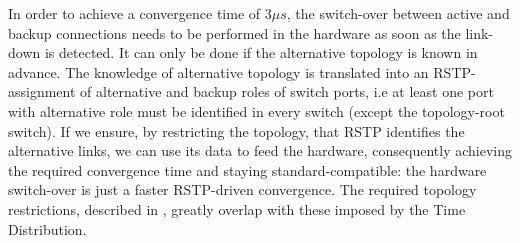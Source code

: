 In order to achieve a convergence time of 3$\mu s$, the switch-over between active 
and backup connections needs to be performed in the hardware as soon as the link-down is detected. 
It can only be done if the alternative topology is known in advance. The knowledge of alternative 
topology is translated into an RSTP-assignment of alternative and backup roles of switch ports, 
i.e at least one port with alternative role must be identified in every switch 
(except the topology-root switch).    
%
%
If we ensure, by restricting the topology, that RSTP identifies the alternative links, 
we can use its data to feed the hardware, consequently achieving the required convergence time 
and staying standard-compatible: 
the hardware switch-over is just a faster RSTP-driven convergence. The required topology 
restrictions, described in \cite{biblio:robustness}, greatly overlap with these imposed by 
the Time Distribution. 

 

